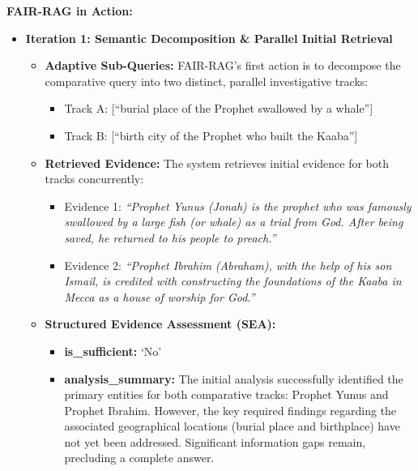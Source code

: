 \documentclass[11pt]{article}
\begin{document}
\textbf{FAIR-RAG in Action:}

\begin{itemize}
\item \textbf{Iteration 1: Semantic Decomposition \& Parallel Initial Retrieval}
  \begin{itemize}
  \item \textbf{Adaptive Sub-Queries:} FAIR-RAG's first action is to decompose the comparative query into two distinct, parallel investigative tracks:
    \begin{itemize}
    \item Track A: [``burial place of the Prophet swallowed by a whale'']
    \item Track B: [``birth city of the Prophet who built the Kaaba'']
    \end{itemize}
  \item \textbf{Retrieved Evidence:} The system retrieves initial evidence for both tracks concurrently:
    \begin{itemize}
    \item Evidence 1: \emph{``Prophet Yunus (Jonah) is the prophet who was famously swallowed by a large fish (or whale) as a trial from God. After being saved, he returned to his people to preach.''}
    \item Evidence 2: \emph{``Prophet Ibrahim (Abraham), with the help of his son Ismail, is credited with constructing the foundations of the Kaaba in Mecca as a house of worship for God.''}
    \end{itemize}
  \item \textbf{Structured Evidence Assessment (SEA):}
    \begin{itemize}
    \item \textbf{is\_sufficient:} `No'
    \item \textbf{analysis\_summary:} The initial analysis successfully identified the primary entities for both comparative tracks: Prophet Yunus and Prophet Ibrahim. However, the key required findings regarding the associated geographical locations (burial place and birthplace) have not yet been addressed. Significant information gaps remain, precluding a complete answer.
    \end{itemize}
  \end{itemize}


\end{itemize}
\end{document}
